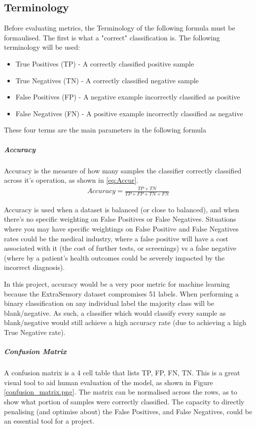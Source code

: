 \documentclass{UoNMCHA}
\newcommand{\fref}[1] {Figure \ref{#1}}
\numberwithin{equation}{section}
\begin{document}
\subsection{Terminology} 
Before evaluating metrics, the Terminology of the following formula must be formaulised. The first is what a "correct" classification is. The following terminology will be used:
\begin{itemize}
    \item True Positives (TP) - A correctly classified positive sample
    \item True Negatives (TN) - A correctly classified negative sample
    \item False Positives (FP) - A negative example incorrectly classified as positive
    \item False Negatives (FN) - A positive example incorrectly classified as negative
\end{itemize}

These four terms are the main parameters in the following formula

\subparagraph{Accuracy} 
Accuracy is the measure of how many samples the classifier correctly classified across it's operation, as shown in \ref{eq:Accur}.
\begin{gather}\label{eq:Accur}
    Accuracy = \frac{TP+TN}{TP+FP+TN+FN}
\end{gather}

Accuracy is used when a dataset is balanced (or close to balanced), and when there's no specific weighting on False Positives or False Negatives. Situations where you may have specific weightings on False Positive and False Negatives rates could be the medical industry, where a false positive will have a cost associated with it (the cost of further tests, or screenings) vs a false negative (where by a patient's health outcomes could be severely impacted by the incorrect diagnosis).

In this project, accuracy would be a very poor metric for machine learning because the ExtraSensory dataset compromises 51 labels. When performing a binary classification on any individual label the majority class will be blank/negative. As such, a classifier which would classify every sample as blank/negative would still achieve a high accuracy rate (due to achieving a high True Negative rate).

\subparagraph{Confusion Matrix}
A confusion matrix is a 4 cell table that lists TP, FP, FN, TN. This is a great visual tool to aid human evaluation of the model, as shown in \fref{confusion_matrix.png}. The matrix can be normalised across the rows, as to show what portion of samples were correctly classified. The capacity to directly penalising (and optimise about) the False Positives, and False Negatives, could be an essential tool for a project. 
\end{document}
